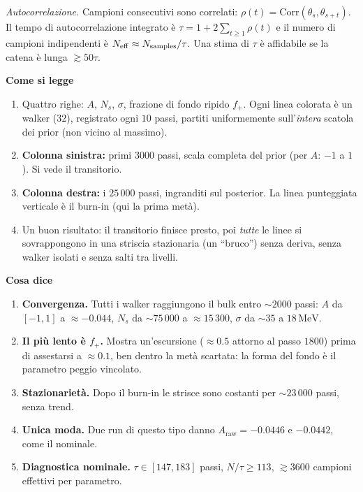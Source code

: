 \documentclass[10.5pt,a4paper]{article}
\newcommand{\Araw}{A_{\mathrm{raw}}}
\newcommand{\MeV}{\,\mathrm{MeV}}
\newcommand{\sez}[1]{\par\Needspace{6\baselineskip}\medskip\noindent\textbf{\large #1}\par\nopagebreak\smallskip}
\begin{document}
\emph{Autocorrelazione.} Campioni consecutivi sono correlati: $\rho(t)=\mathrm{Corr}(\theta_s,\theta_{s+t})$. Il tempo di autocorrelazione integrato è $\tau=1+2\sum_{t\ge1}\rho(t)$ e il numero di campioni indipendenti è $N_{\rm eff}\approx N_{\rm samples}/\tau$. Una stima di $\tau$ è affidabile se la catena è lunga $\gtrsim50\tau$.

\sez{Come si legge}
\begin{enumerate}
\item Quattro righe: $A$, $N_s$, $\sigma$, frazione di fondo ripido $f_+$. Ogni linea colorata è un walker ($32$), registrato ogni $10$ passi, partiti uniformemente sull'\emph{intera} scatola dei prior (non vicino al massimo).
\item \textbf{Colonna sinistra:} primi $3000$ passi, scala completa del prior (per $A$: $-1$ a $1$). Si vede il transitorio.
\item \textbf{Colonna destra:} i $25\,000$ passi, ingranditi sul posterior. La linea punteggiata verticale è il burn-in (qui la prima metà).
\item Un buon risultato: il transitorio finisce presto, poi \emph{tutte} le linee si sovrappongono in una striscia stazionaria (un ``bruco'') senza deriva, senza walker isolati e senza salti tra livelli.
\end{enumerate}

\sez{Cosa dice}
\begin{enumerate}
\item \textbf{Convergenza.} Tutti i walker raggiungono il bulk entro $\sim2000$ passi: $A$ da $[-1,1]$ a $\approx-0.044$, $N_s$ da $\sim75\,000$ a $\approx15\,300$, $\sigma$ da $\sim35$ a $18\MeV$.
\item \textbf{Il più lento è $f_+$.} Mostra un'escursione ($\approx0.5$ attorno al passo $1800$) prima di assestarsi a $\approx0.1$, ben dentro la metà scartata: la forma del fondo è il parametro peggio vincolato.
\item \textbf{Stazionarietà.} Dopo il burn-in le strisce sono costanti per $\sim23\,000$ passi, senza trend.
\item \textbf{Unica moda.} Due run di questo tipo danno $\Araw=-0.0446$ e $-0.0442$, come il nominale.
\item \textbf{Diagnostica nominale.} $\tau\in[147,183]$ passi, $N/\tau\ge113$, $\gtrsim3600$ campioni effettivi per parametro.
\end{enumerate}
\end{document}
